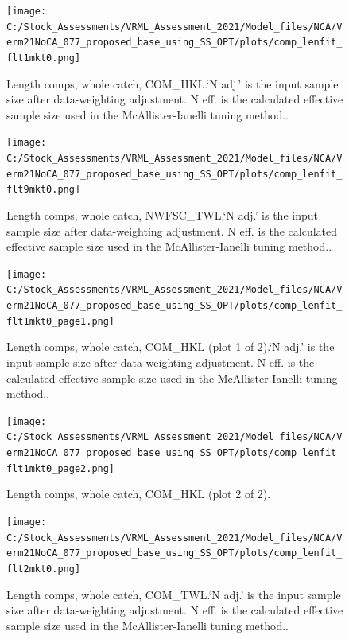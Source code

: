 \documentclass[11pt,
  english,
  a4paper,
]{article}
\begin{document}
\begin{figure}
\centering
\texttt{[image: C:/Stock\_Assessments/VRML\_Assessment\_2021/Model\_files/NCA/Verm21NoCA\_077\_proposed\_base\_using\_SS\_OPT/plots/comp\_lenfit\_flt1mkt0.png]}
\caption{Length comps, whole catch, COM\_HKL.`N adj.' is the input sample size after data-weighting adjustment. N eff. is the calculated effective sample size used in the McAllister-Ianelli tuning method..\label{fig:comp_lenfit_flt1mkt0}}
\end{figure}

\begin{figure}
\centering
\texttt{[image: C:/Stock\_Assessments/VRML\_Assessment\_2021/Model\_files/NCA/Verm21NoCA\_077\_proposed\_base\_using\_SS\_OPT/plots/comp\_lenfit\_flt9mkt0.png]}
\caption{Length comps, whole catch, NWFSC\_TWL.`N adj.' is the input sample size after data-weighting adjustment. N eff. is the calculated effective sample size used in the McAllister-Ianelli tuning method..\label{fig:comp_lenfit_flt9mkt0}}
\end{figure}

\begin{figure}
\centering
\texttt{[image: C:/Stock\_Assessments/VRML\_Assessment\_2021/Model\_files/NCA/Verm21NoCA\_077\_proposed\_base\_using\_SS\_OPT/plots/comp\_lenfit\_flt1mkt0\_page1.png]}
\caption{Length comps, whole catch, COM\_HKL (plot 1 of 2).`N adj.' is the input sample size after data-weighting adjustment. N eff. is the calculated effective sample size used in the McAllister-Ianelli tuning method..\label{fig:comp_lenfit_flt1mkt0_page1}}
\end{figure}

\begin{figure}
\centering
\texttt{[image: C:/Stock\_Assessments/VRML\_Assessment\_2021/Model\_files/NCA/Verm21NoCA\_077\_proposed\_base\_using\_SS\_OPT/plots/comp\_lenfit\_flt1mkt0\_page2.png]}
\caption{Length comps, whole catch, COM\_HKL (plot 2 of 2).\label{fig:comp_lenfit_flt1mkt0_page2}}
\end{figure}

\begin{figure}
\centering
\texttt{[image: C:/Stock\_Assessments/VRML\_Assessment\_2021/Model\_files/NCA/Verm21NoCA\_077\_proposed\_base\_using\_SS\_OPT/plots/comp\_lenfit\_flt2mkt0.png]}
\caption{Length comps, whole catch, COM\_TWL.`N adj.' is the input sample size after data-weighting adjustment. N eff. is the calculated effective sample size used in the McAllister-Ianelli tuning method..\label{fig:comp_lenfit_flt2mkt0}}
\end{figure}
\end{document}
